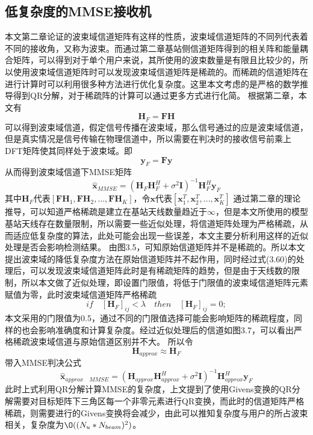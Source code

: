 \documentclass[bachelor,nocolorlinks, printoneside]{seuthesis} %
\begin{document}
\begin{Main}
\section{低复杂度的MMSE接收机}
本文第二章论证的波束域信道矩阵有这样的性质，波束域信道矩阵的不同列代表着不同的接收角，又称为波束。而通过第二章基站侧信道矩阵得到的相关阵和能量耦合矩阵，可以得到对于单个用户来说，其所使用的波束数量是有限且比较少的，所以使用波束域信道矩阵时可以发现波束域信道矩阵是稀疏的。而稀疏的信道矩阵在进行计算时可以利用很多种方法进行优化复杂度。这里本文考虑的是严格的数学推导得到QR分解，对于稀疏阵的计算可以通过更多方式进行化简。
根据第二章，本文有
\begin{equation}\label{key}
\mathbf{H}_{F} = \mathbf{F} \mathbf{H}
\end{equation}
可以得到波束域信道，假定信号传播在波束域，那么信号通过的应是波束域信道，但是真实情况是信号传输在物理信道中，所以需要在判决时的接收信号前乘上DFT矩阵使其同样处于波束域。即
\begin{equation}\label{key}
\mathbf{y}_F =\mathbf{F} \mathbf{y}
\end{equation}
从而得到波束域信道下MMSE矩阵
\begin{equation}\label{key}
\hat{\mathbf{x}}_{MMSE} = (\mathbf{H}_F\mathbf{H}_F^H + \sigma^2 \mathbf{I})^{-1}\mathbf{H}_F^H \mathbf{y}_F
\end{equation}
其中$\mathbf{H}_F$代表$[\mathbf{F}\mathbf{H}_1,\mathbf{F}\mathbf{H}_2,...,\mathbf{F}\mathbf{H}_K]$，令$\mathbf{x}$代表$[\mathbf{x}_1^T,\mathbf{x}_2^T,...,\mathbf{x}_K^T]$
通过第二章的理论推导，可以知道严格稀疏是建立在基站天线数量趋近于$\infty$，但是本文所使用的模型基站天线存在数量限制，所以需要一些近似处理，将信道矩阵处理为严格稀疏，从而适应低复杂度的算法，此处可能会出现一些误差，本文主要分析利用这样的近似处理是否会影响检测结果。
由图3.5，可知原始信道矩阵并不是稀疏的。所以本文提出波束域的降低复杂度方法在原始信道矩阵并不起作用，同时经过式(3.60)的处理后，可以发现波束域信道矩阵此时是有稀疏矩阵的趋势，但是由于天线数的限制，所以本文做了近似处理，即设置门限值，将低于门限值的波束域信道矩阵元素赋值为零，此时波束域信道矩阵严格稀疏
\begin{equation}\label{key}
if\quad [\mathbf{H}_F]_{ij} <\lambda \quad then \quad [\mathbf{H}_F]_{ij}=0;
\end{equation}
本文采用的门限值为0.5，通过不同的门限值选择可能会影响矩阵的稀疏程度，同样的也会影响准确度和计算复杂度。经过近似处理后的信道如图3.7，可以看出严格稀疏波束域信道与原始信道区别并不大。
所以令
\begin{equation}\label{key}
\mathbf{H}_{approx} \approx \mathbf{H}_F
\end{equation}
带入MMSE判决公式
\begin{equation}\label{key}
\hat{\mathbf{x}}_{approx\quad MMSE} = (\mathbf{H}_{approx}\mathbf{H}_{approx}^H + \sigma^2 \mathbf{I})^{-1}\mathbf{H}_{approx}^H \mathbf{y}_F
\end{equation}
此时上式利用QR分解计算MMSE的复杂度，上文提到了使用Givens变换的QR分解需要对目标矩阵下三角区每一个非零元素进行QR变换，而此时的信道矩阵严格稀疏，则需要进行的Givens变换将会减少，由此可以推知复杂度与用户的所占波束相关，复杂度为$\O((N_u*N_{beam})^2)$。


\end{Main}
\end{document}
